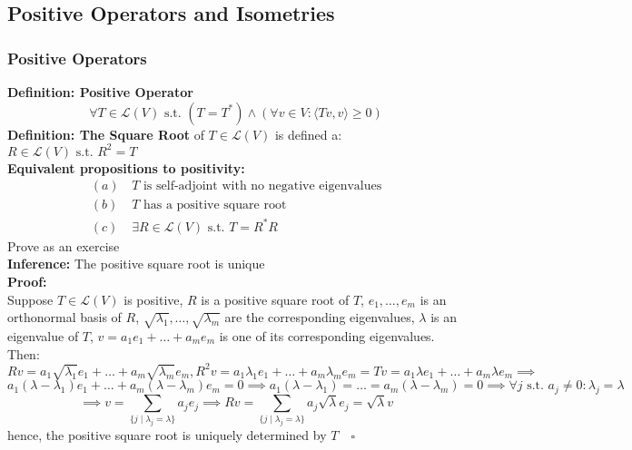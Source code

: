 \documentclass{article}
\newcommand{\st}{\mbox{ s.t. }}
\newcommand{\0}{{\bf{0}}}
\begin{document}
\subsection{Positive Operators and Isometries}
\subsubsection{Positive Operators}
\textbf{Definition: Positive Operator}
$$\forall T\in\mathcal{L}(V)\st(T=T^*)\land(\forall v\in V:\langle Tv,v\rangle\geq0)$$
\textbf{Definition: The Square Root} of $T\in\mathcal{L}(V)$ is defined a: $R\in\mathcal{L}(V)\st R^2=T$\\
\textbf{Equivalent propositions to positivity:}
\begin{equation}
\begin{split}
    (a)\,&T\mbox{ is self-adjoint with no negative eigenvalues}\\
    (b)\,&T\mbox{ has a positive square root}\\
    (c)\,&\exists R\in\mathcal{L}(V)\st T=R^*R
\end{split}
\end{equation}
\null\hfill{Prove as an exercise}\\
\textbf{Inference:} The positive square root is unique\\
\textbf{Proof:}\\
Suppose $T\in\mathcal{L}(V)$ is positive, $R$ is a positive square root of $T$, $e_1,\dots,e_m$ is an orthonormal basis of $R$, $\sqrt{\lambda_1},\dots,\sqrt{\lambda_m}$ are the corresponding eigenvalues, $\lambda$ is an eigenvalue of $T$, $v=a_1e_1+\dots+a_me_m$ is one of its corresponding eigenvalues. Then:
$$Rv=a_1\sqrt{\lambda_1}e_1+\dots+a_m\sqrt{\lambda_m}e_m,R^2v=a_1\lambda_1e_1+\dots+a_m\lambda_me_m=Tv=a_1\lambda e_1+\dots+a_m\lambda e_m\implies$$
$$a_1(\lambda-\lambda_1)e_1+\dots+a_m(\lambda-\lambda_m)e_m=0\implies a_1(\lambda-\lambda_1)=\dots=a_m(\lambda-\lambda_m)=0\implies\forall j\st a_j\neq0:\lambda_j=\lambda$$
$$\implies v=\sum_{\{j\mid\lambda_j=\lambda\}}a_je_j\implies Rv=\sum_{\{j\mid\lambda_j=\lambda\}}a_j\sqrt{\lambda}e_j=\sqrt{\lambda}v$$
hence, the positive square root is uniquely determined by $T\quad\square$
\end{document}
